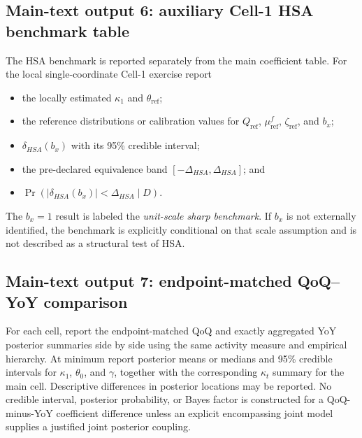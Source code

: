 \documentclass[11pt]{article}
\begin{document}
\subsection{Main-text output 6: auxiliary Cell-1 HSA benchmark table}
The HSA benchmark is reported separately from the main coefficient table. For the local single-coordinate Cell-1 exercise report
\begin{itemize}
\item the locally estimated $\kappa_1$ and $\theta_{\mathrm{ref}}$;
\item the reference distributions or calibration values for $Q_{\mathrm{ref}}$, $\mu_{\mathrm{ref}}^f$, $\zeta_{\mathrm{ref}}$, and $b_x$;
\item $\delta_{HSA}(b_x)$ with its 95\% credible interval;
\item the pre-declared equivalence band $[-\Delta_{HSA},\Delta_{HSA}]$; and
\item $\Pr\!\left(|\delta_{HSA}(b_x)|<\Delta_{HSA}\mid D\right)$.
\end{itemize}
The $b_x=1$ result is labeled the \emph{unit-scale sharp benchmark}. If $b_x$ is not externally identified, the benchmark is explicitly conditional on that scale assumption and is not described as a structural test of HSA.

\subsection{Main-text output 7: endpoint-matched QoQ--YoY comparison}
For each cell, report the endpoint-matched QoQ and exactly aggregated YoY posterior summaries side by side using the same activity measure and empirical hierarchy. At minimum report posterior means or medians and 95\% credible intervals for $\kappa_1$, $\theta_0$, and $\gamma$, together with the corresponding $\kappa_t$ summary for the main cell. Descriptive differences in posterior locations may be reported. No credible interval, posterior probability, or Bayes factor is constructed for a QoQ-minus-YoY coefficient difference unless an explicit encompassing joint model supplies a justified joint posterior coupling.
\end{document}
